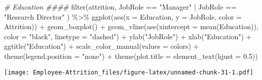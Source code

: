 \documentclass[
]{article}
\newenvironment{Shaded}{\begin{snugshade}}{\end{snugshade}}
\newcommand{\AttributeTok}[1]{\textcolor[rgb]{0.77,0.63,0.00}{#1}}
\newcommand{\CommentTok}[1]{\textcolor[rgb]{0.56,0.35,0.01}{\textit{#1}}}
\newcommand{\FloatTok}[1]{\textcolor[rgb]{0.00,0.00,0.81}{#1}}
\newcommand{\FunctionTok}[1]{\textcolor[rgb]{0.00,0.00,0.00}{#1}}
\newcommand{\NormalTok}[1]{#1}
\newcommand{\SpecialCharTok}[1]{\textcolor[rgb]{0.00,0.00,0.00}{#1}}
\newcommand{\StringTok}[1]{\textcolor[rgb]{0.31,0.60,0.02}{#1}}
\begin{document}
\begin{Shaded}
\begin{Highlighting}[]
\CommentTok{\# Education \#\#\#\#}
\FunctionTok{filter}\NormalTok{(attrition, JobRole }\SpecialCharTok{==} \StringTok{"Manager"} \SpecialCharTok{|}\NormalTok{ JobRole }\SpecialCharTok{==} \StringTok{"Research Director"}\NormalTok{ ) }\SpecialCharTok{\%\textgreater{}\%}
  \FunctionTok{ggplot}\NormalTok{(}\FunctionTok{aes}\NormalTok{(}\AttributeTok{x =}\NormalTok{ Education, }\AttributeTok{y =}\NormalTok{ JobRole, }\AttributeTok{color =}\NormalTok{ Attrition)) }\SpecialCharTok{+}
  \FunctionTok{geom\_boxplot}\NormalTok{() }\SpecialCharTok{+}
  \FunctionTok{geom\_vline}\NormalTok{(}\FunctionTok{aes}\NormalTok{(}\AttributeTok{xintercept =} \FunctionTok{mean}\NormalTok{(Education)), }\AttributeTok{color =} \StringTok{"black"}\NormalTok{, }\AttributeTok{linetype =} \StringTok{"dashed"}\NormalTok{) }\SpecialCharTok{+}
  \FunctionTok{ylab}\NormalTok{(}\StringTok{"JobRole"}\NormalTok{) }\SpecialCharTok{+}
  \FunctionTok{xlab}\NormalTok{(}\StringTok{"Education"}\NormalTok{) }\SpecialCharTok{+}
  \FunctionTok{ggtitle}\NormalTok{(}\StringTok{"Education"}\NormalTok{) }\SpecialCharTok{+}
  \FunctionTok{scale\_color\_manual}\NormalTok{(}\AttributeTok{values =}\NormalTok{ colors) }\SpecialCharTok{+}
  \FunctionTok{theme}\NormalTok{(}\AttributeTok{legend.position =} \StringTok{"none"}\NormalTok{) }\SpecialCharTok{+}
  \FunctionTok{theme}\NormalTok{(}\AttributeTok{plot.title =} \FunctionTok{element\_text}\NormalTok{(}\AttributeTok{hjust =} \FloatTok{0.5}\NormalTok{)) }
\end{Highlighting}
\end{Shaded}

\texttt{[image: Employee-Attrition\_files/figure-latex/unnamed-chunk-31-1.pdf]}
\end{document}
